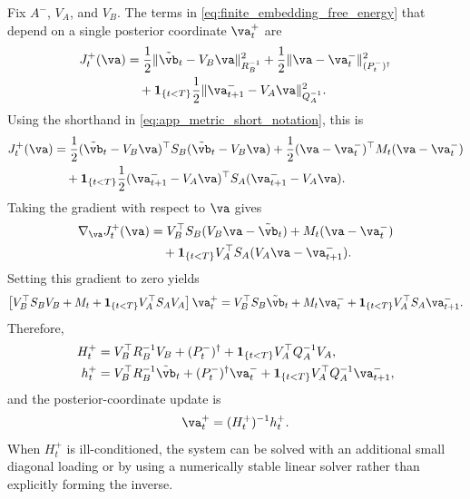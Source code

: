 \documentclass[twoside,11pt]{article}
\begin{document}
Fix $A^-$, $V_A$, and $V_B$. The terms in
\eqref{eq:finite_embedding_free_energy} that depend on a single
posterior coordinate $\va_t^+$ are
\begin{align}
J_t^+(\va)
&=
\frac12
\|\tilde{\vb}_t - V_B\va\|_{R_B^{-1}}^2
+
\frac12
\|\va-\va_t^-\|_{(P_t^-)^\dagger}^2
\nonumber\\
&\quad+
\mathbf 1_{\{t<T\}}
\frac12
\|\va_{t+1}^- - V_A\va\|_{Q_A^{-1}}^2 .
\label{eq:app_Aplus_local_objective}
\end{align}
Using the shorthand in \eqref{eq:app_metric_short_notation}, this is
\begin{align}
J_t^+(\va)
&=
\frac12
(\tilde{\vb}_t - V_B\va)^\top
S_B
(\tilde{\vb}_t - V_B\va)
+
\frac12
(\va-\va_t^-)^\top
M_t
(\va-\va_t^-)
\nonumber\\
&\quad+
\mathbf 1_{\{t<T\}}
\frac12
(\va_{t+1}^- - V_A\va)^\top
S_A
(\va_{t+1}^- - V_A\va).
\label{eq:app_Aplus_local_objective_expanded}
\end{align}
Taking the gradient with respect to $\va$ gives
\begin{align}
\nabla_\va J_t^+(\va)
&=
V_B^\top S_B
(V_B\va-\tilde{\vb}_t)
+
M_t(\va-\va_t^-)
\nonumber\\
&\quad+
\mathbf 1_{\{t<T\}}
V_A^\top S_A
(V_A\va-\va_{t+1}^-).
\label{eq:app_Aplus_gradient}
\end{align}
Setting this gradient to zero yields
\begin{align}
\left[
V_B^\top S_B V_B
+
M_t
+
\mathbf 1_{\{t<T\}}
V_A^\top S_A V_A
\right]\va_t^+
=
V_B^\top S_B\tilde{\vb}_t
+
M_t\va_t^-
+
\mathbf 1_{\{t<T\}}
V_A^\top S_A\va_{t+1}^-.
\label{eq:app_Aplus_normal_equation_short}
\end{align}
Therefore,
\begin{align}
H_t^+
&=
V_B^\top R_B^{-1}V_B
+
(P_t^-)^\dagger
+
\mathbf 1_{\{t<T\}}
V_A^\top Q_A^{-1}V_A,
\label{eq:app_Aplus_H}
\\
h_t^+
&=
V_B^\top R_B^{-1}\tilde{\vb}_t
+
(P_t^-)^\dagger\va_t^-
+
\mathbf 1_{\{t<T\}}
V_A^\top Q_A^{-1}\va_{t+1}^-,
\label{eq:app_Aplus_h}
\end{align}
and the posterior-coordinate update is
\begin{align}
\va_t^+
=
(H_t^+)^{-1}h_t^+.
\label{eq:app_Aplus_solution}
\end{align}
When $H_t^+$ is ill-conditioned, the system can be solved with an
additional small diagonal loading or by using a numerically stable
linear solver rather than explicitly forming the inverse.
\end{document}
